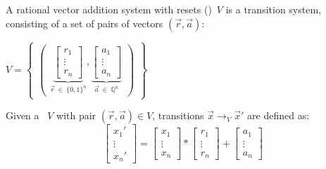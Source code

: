 \begin{frame}[t]
	\frametitle{\qvasr}
	\begin{definition}[\qvasr]
		A rational vector addition system with resets (\qvasr)\ $V$ is a transition system, consisting of a set of pairs of vectors $(\vec{r}, \vec{a})$:\\
		\begin{center}
			$ V = 
			\begin{Bmatrix}
				\begin{pmatrix}
					\underbrace{
						\begin{bmatrix}
							r_1 \\
							\vdots \\
							r_n
					\end{bmatrix}}_{\vec{r}\ \in\ \{0,1\}^n},
					\underbrace{
						\begin{bmatrix}
							a_1 \\
							\vdots \\
							a_n
					\end{bmatrix}}_{\vec{a}\ \in\ \mathbb{Q}^n}
				\end{pmatrix}
			\end{Bmatrix}
			$
		\end{center}
	\end{definition}
	\begin{center}
		Given a \qvasr\ $V$ with pair $(\vec{r}, \vec{a}) \in V$, transitions $\vec{x} \rightarrow_V \vec{x}'$ are defined as: \\
			\begin{equation*}
				\begin{bmatrix}
					x_1' \\
					\vdots \\
					x_n'
				\end{bmatrix}
				=
				\begin{bmatrix}
					x_1 \\
					\vdots \\
					x_n
				\end{bmatrix}
				*
				\begin{bmatrix}
					r_1 \\
					\vdots \\
					r_n
				\end{bmatrix}
				+
				\begin{bmatrix}
					a_1 \\
					\vdots \\
					a_n
				\end{bmatrix}		
			\end{equation*}
		\end{center}
\end{frame}